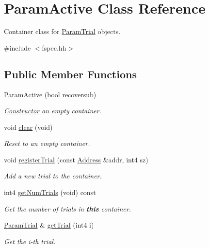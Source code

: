 \hypertarget{class_param_active}{}\section{Param\+Active Class Reference}
\label{class_param_active}


Container class for \mbox{\hyperlink{class_param_trial}{Param\+Trial}} objects.  




{\ttfamily \#include $<$fspec.\+hh$>$}

\subsection*{Public Member Functions}
\begin{DoxyCompactItemize}
\item 
\mbox{\hyperlink{class_param_active_aa8913b6e862e54ff8fce9b3c22badc5b}{Param\+Active}} (bool recoversub)
\begin{DoxyCompactList}\small\item\em \mbox{\hyperlink{class_constructor}{Constructor}} an empty container. \end{DoxyCompactList}\item 
void \mbox{\hyperlink{class_param_active_afadcd4621258a53d5edd7f7d4430eb7b}{clear}} (void)
\begin{DoxyCompactList}\small\item\em Reset to an empty container. \end{DoxyCompactList}\item 
void \mbox{\hyperlink{class_param_active_a43a357162f55b3b8f7e13a013ad207b5}{register\+Trial}} (const \mbox{\hyperlink{class_address}{Address}} \&addr, int4 sz)
\begin{DoxyCompactList}\small\item\em Add a new trial to the container. \end{DoxyCompactList}\item 
int4 \mbox{\hyperlink{class_param_active_aef5c24a78fbfe7a847eceec2c8854fbb}{get\+Num\+Trials}} (void) const
\begin{DoxyCompactList}\small\item\em Get the number of trials in {\bfseries{this}} container. \end{DoxyCompactList}\item 
\mbox{\hyperlink{class_param_trial}{Param\+Trial}} \& \mbox{\hyperlink{class_param_active_a88fb46565155de0123b634951a186f74}{get\+Trial}} (int4 i)
\begin{DoxyCompactList}\small\item\em Get the i-\/th trial. \end{DoxyCompactList}\item 

\end{DoxyCompactItemize}

